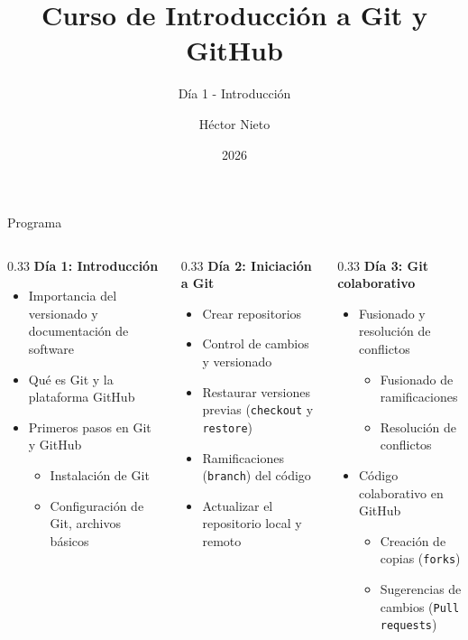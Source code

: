 \documentclass{beamer}
\title{Curso de Introducción a Git y GitHub}
\subtitle{Día 1 - Introducción}
\author{Héctor Nieto}
\institute{Instituto de Ciencias Agrarias, CSIC}
\date{2026}
\begin{document}
 \begin{frame}
  \titlepage
 \end{frame}


 \begin{frame}{Programa}
  \small
  \begin{columns}[T]
   \begin{column}{0.33\linewidth}
    \textbf{Día 1: Introducción}
    \begin{itemize}
     \item Importancia del versionado y documentación de software
     \item Qué es Git y la plataforma GitHub
     \item Primeros pasos en Git y GitHub
     \begin{itemize}
      \item Instalación de Git
      \item Configuración de Git, archivos básicos
     \end{itemize}
    \end{itemize}
   \end{column}
   \begin{column}{0.33\linewidth}
    \textbf{Día 2: Iniciación a Git}
    \begin{itemize}
     \item Crear repositorios
     \item Control de cambios y versionado
     \item Restaurar versiones previas (\texttt{checkout} y \texttt{restore})
     \item Ramificaciones (\texttt{branch}) del código
     \item Actualizar el repositorio  local y remoto
    \end{itemize}
   \end{column}
   \begin{column}{0.33\linewidth}
    \textbf{Día 3: Git colaborativo}
    \begin{itemize}
     \item Fusionado y resolución de conflictos
     \begin{itemize}
      \item Fusionado de ramificaciones
      \item Resolución de conflictos
     \end{itemize}
     \item Código colaborativo en GitHub
     \begin{itemize}
      \item Creación de copias (\texttt{forks})
      \item Sugerencias de cambios (\texttt{Pull requests})
     \end{itemize}
    \end{itemize}
   \end{column}
  \end{columns}
 \end{frame}
\end{document}
